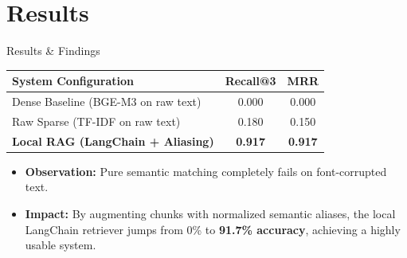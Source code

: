 \documentclass[11pt,aspectratio=169]{beamer}
\begin{document}
\section{Results}
\begin{frame}{Results \& Findings}
    \begin{table}[]
        \centering
        \begin{tabular}{@{}lcc@{}}
        \toprule
        \textbf{System Configuration} & \textbf{Recall@3} & \textbf{MRR} \\ \midrule
        Dense Baseline (BGE-M3 on raw text) & 0.000 & 0.000 \\ 
        Raw Sparse (TF-IDF on raw text) & 0.180 & 0.150 \\ 
        \textbf{Local RAG (LangChain + Aliasing)} & \textbf{0.917} & \textbf{0.917} \\ \bottomrule
        \end{tabular}
    \end{table}
    \begin{itemize}
        \item \textbf{Observation:} Pure semantic matching completely fails on font-corrupted text.
        \item \textbf{Impact:} By augmenting chunks with normalized semantic aliases, the local LangChain retriever jumps from 0\% to \textbf{91.7\% accuracy}, achieving a highly usable system.
    \end{itemize}
\end{frame}

\end{document}
